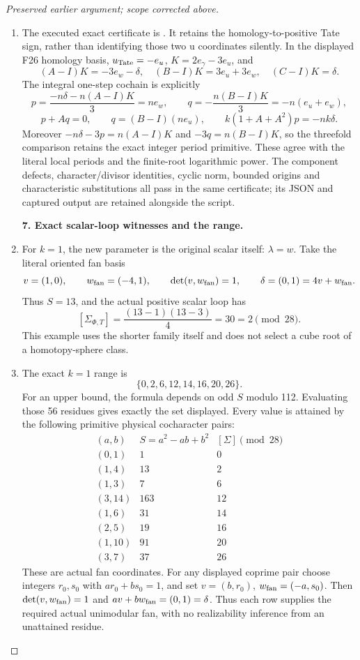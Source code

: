 \begin{proof}[Preserved earlier argument; scope corrected above]
\begin{enumerate}[label=\arabic*.]
\item The executed exact certificate is
. It retains the homology-to-positive
Tate sign, rather than identifying those two u coordinates silently. In the
displayed F26 homology basis,
\(u_{\rm Tate}=-e_u\), \(K=2e_\gamma-3e_u\), and
\[
 (A-I)K=-3e_w-\delta,\quad
 (B-I)K=3e_u+3e_w,\quad (C-I)K=\delta.
\]
The integral one-step cochain is explicitly
\[
 p=\frac{-n\delta-n(A-I)K}{3}=ne_w,\qquad
 q=-\frac{n(B-I)K}{3}=-n(e_u+e_w),
\]
\[
 p+Aq=0,\qquad q=(B-I)(ne_u),\qquad
 k(1+A+A^2)p=-nk\delta.
\]
Moreover \(-n\delta-3p=n(A-I)K\) and \(-3q=n(B-I)K\),
so the threefold comparison retains the exact integer period primitive.
These agree with the literal local periods and the finite-root logarithmic
power. The component defects, character/divisor identities, cyclic norm,
bounded origins and characteristic substitutions all pass in the same
certificate; its JSON and captured output are retained alongside the script.

\par\medskip\noindent\textbf{7. Exact scalar-loop witnesses and the range.}\enspace

\item For \(k=1\), the new parameter is the original scalar itself:
\(\lambda=w\). Take the literal oriented fan basis
\[
 v=(1,0),\qquad w_{\rm fan}=(-4,1),\qquad
 \det(v,w_{\rm fan})=1,\qquad \delta=(0,1)=4v+w_{\rm fan}.
\]
Thus \(S=13\), and the actual positive scalar loop has
\[
 [\Sigma_{\Phi,T}]=\frac{(13-1)(13-3)}4=30=2\pmod {28}.
\]
This example uses the shorter family itself and does not select a cube root
of a homotopy-sphere class.

\item The exact \(k=1\) range is
\[
                  \{0,2,6,12,14,16,20,26\}.                    \tag{P3K.37.15}
\]
For an upper bound, the formula depends on odd \(S\) modulo 112. Evaluating
those 56 residues gives exactly the set displayed. Every value is attained
by the following primitive physical cocharacter pairs:
\[
\begin{array}{c|r|r}
 (a,b)&S=a^2-ab+b^2&[\Sigma]\pmod {28}\\ \hline
 (0,1)&1&0\\
 (1,4)&13&2\\
 (1,3)&7&6\\
 (3,14)&163&12\\
 (1,6)&31&14\\
 (2,5)&19&16\\
 (1,10)&91&20\\
 (3,7)&37&26
\end{array}
\]
These are actual fan coordinates. For any displayed coprime pair choose
integers \(r_0,s_0\) with \(ar_0+bs_0=1\), and set
\(v=(b,r_0)\), \(w_{\rm fan}=(-a,s_0)\). Then
\(\det(v,w_{\rm fan})=1\) and \(av+bw_{\rm fan}=(0,1)=\delta\).
Thus each row supplies the required actual unimodular fan, with no
realizability inference from an unattained residue.


\end{enumerate}
\end{proof}

